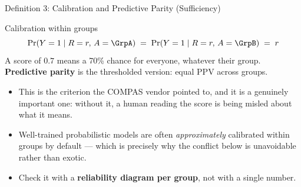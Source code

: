 \begin{frame}{Definition 3: Calibration and Predictive Parity (Sufficiency)}

    \begin{block}{Calibration within groups}
        \[
            \Pr(Y = 1 \mid R = r,\, A = \GrpA) \;=\; \Pr(Y = 1 \mid R = r,\, A = \GrpB) \;=\; r
        \]
        A score of $0.7$ means a 70\% chance for everyone, whatever their group.
        \textbf{Predictive parity} is the thresholded version: equal PPV across groups.
    \end{block}

    \vspace{0.8em}

    \begin{itemize}
        \setlength\itemsep{0.45em}
        \item This is the criterion the COMPAS vendor pointed to, and it is a genuinely important
              one: without it, a human reading the score is being misled about what it means.
        \item Well-trained probabilistic models are often \emph{approximately} calibrated
              within groups by default --- which is precisely why the conflict below is unavoidable
              rather than exotic.
        \item Check it with a \textbf{reliability diagram per group}, not with a single number.
    \end{itemize}
\end{frame}

